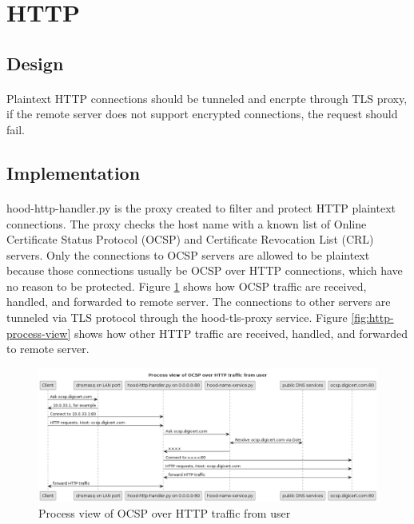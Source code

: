 \documentclass[mscthesis]{usiinfthesis}
\begin{document}
\section{HTTP}
\subsection{Design}
\paragraph{}
Plaintext HTTP connections should be tunneled and encrpte through TLS proxy, if the remote server does not support encrypted connections, the request should fail.
\subsection{Implementation}
\paragraph{}
hood-http-handler.py is the proxy created to filter and protect HTTP plaintext connections. The proxy checks the host name with a known list of Online Certificate Status Protocol (OCSP) and Certificate Revocation List (CRL) servers. Only the connections to OCSP servers are allowed to be plaintext because those connections usually be OCSP over HTTP connections, which have no reason to be protected. Figure \ref{fig:ocsp-process-view} shows how OCSP traffic are received, handled, and forwarded to remote server. The connections to other servers are tunneled via TLS protocol through the hood-tls-proxy service. Figure \ref{fig:http-process-view} shows how other HTTP traffic are received, handled, and forwarded to remote server.

\begin{figure}[H]
  \includegraphics[width=\textheight, angle=90]{graphics/puml/process-ocsp-traffic.png}
  \caption{Process view of OCSP over HTTP traffic from user}
  \label{fig:ocsp-process-view}
\end{figure}
\end{document}
